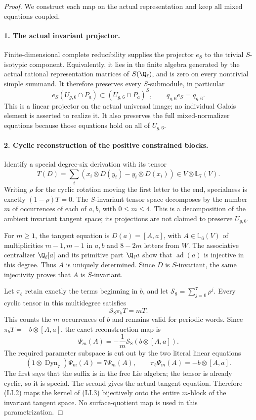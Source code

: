 \begin{proof}
We construct each map on the actual representation and keep all mixed equations coupled.
\paragraph{1. The actual invariant projector.}
Finite-dimensional complete reducibility supplies the projector
$e_S$ to the trivial $S$-isotypic component. Equivalently, it
lies in the finite algebra generated by the actual rational
representation matrices of $S(\Q_\ell)$, and is zero on every
nontrivial simple summand. It therefore preserves every
$S$-submodule, in particular
\[
 e_S(U_{g,6}\cap P_a)\subset (U_{g,6}\cap P_a)^S,
                 \qquad q_{g,6}e_S=q_{g,6}.                 \tag{LI.1}
\]
This is a linear projector on the actual universal image;
no individual Galois element is asserted to realize it.
It also preserves the full mixed-normalizer equations because
those equations hold on all of $U_{g,6}$.

\paragraph{2. Cyclic reconstruction of the positive constrained blocks.}
Identify a special degree-six derivation with its tensor
\[
 T(D)=\sum_i(x_i\otimes D(y_i)-y_i\otimes D(x_i))
                       \in V\otimes\mathbb L_7(V).
\]
Writing $\rho$ for the cyclic rotation moving the first letter
to the end, specialness is exactly $(1-\rho)T=0$.
The $S$-invariant tensor space decomposes by the number $m$
of occurrences of each of $a,b$, with $0\leq m\leq4$.
This is a decomposition of the ambient invariant tangent
space; its projections are not claimed to preserve $U_{g,6}$.

For $m\geq1$, the tangent equation is $D(a)=[A,a]$, with
$A\in\mathbb L_6(V)$ of multiplicities $m-1,m-1$ in $a,b$
and $8-2m$ letters from $W$. The associative centralizer
$\Q_\ell[a]$ and its primitive part $\Q_\ell a$ show that
$\operatorname{ad}(a)$ is injective in this degree. Thus $A$
is uniquely determined. Since $D$ is $S$-invariant, the same
injectivity proves that $A$ is $S$-invariant.

Let $\pi_b$ retain exactly the terms beginning in $b$, and
let $\mathcal S_8=\sum_{j=0}^7\rho^j$. Every cyclic tensor
in this multidegree satisfies
\[
                  \mathcal S_8\pi_b T=mT.
\]
This counts the $m$ occurrences of $b$ and remains valid
for periodic words. Since $\pi_bT=-b\otimes[A,a]$, the
exact reconstruction map is
\[
 \Psi_m(A)=-\frac1m\mathcal S_8(b\otimes[A,a]).             \tag{LI.2}
\]
The required parameter subspace is cut out by the two
literal linear equations
\[
 (1\otimes\operatorname{Dyn}_7)\Psi_m(A)=7\Psi_m(A),
          \qquad \pi_b\Psi_m(A)=-b\otimes[A,a].            \tag{LI.3}
\]
The first says that the suffix is in the free Lie algebra;
the tensor is already cyclic, so it is special. The second
gives the actual tangent equation. Therefore (LI.2) maps
the kernel of (LI.3) bijectively onto the entire $m$-block
of the invariant tangent space. No surface-quotient map
is used in this parametrization.


\end{proof}

